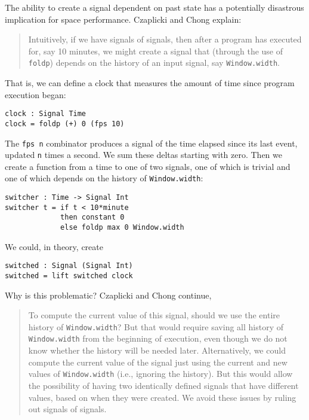 \documentclass{article}
\begin{document}
The ability to create a signal dependent on past state has a potentially
disastrous implication for space performance. Czaplicki and Chong explain:

\begin{quote}
Intuitively, if we have signals of signals, then after a program has executed
for, say 10 minutes, we might create a signal that (through the use of
\texttt{foldp}) depends on the history of an input signal, say
\texttt{Window.width}. \cite{CzaplickiC13}
\end{quote}

That is, we can define a clock that measures the amount of time since
program execution began:

\begin{verbatim}
clock : Signal Time
clock = foldp (+) 0 (fps 10)
\end{verbatim}

The \texttt{fps n} combinator produces a signal of the time elapsed
since its last event, updated \texttt{n} times a second. We sum these
deltas starting with zero. Then we create a function from a time to one
of two signals, one of which is trivial and one of which depends on the
history of \texttt{Window.width}:

\begin{verbatim}
switcher : Time -> Signal Int
switcher t = if t < 10*minute
             then constant 0
             else foldp max 0 Window.width
\end{verbatim}

We could, in theory, create

\begin{verbatim}
switched : Signal (Signal Int)
switched = lift switched clock
\end{verbatim}

Why is this problematic? Czaplicki and Chong continue,

\begin{quote}
To compute the current value of this signal, should we use the entire
history of \texttt{Window.width}? But that would require saving all
history of \texttt{Window.width} from the beginning of execution, even
though we do not know whether the history will be needed later.
Alternatively, we could compute the current value of the signal just
using the current and new values of \texttt{Window.width} (i.e.,
ignoring the history). But this would allow the possibility of having
two identically defined signals that have different values, based on
when they were created. We avoid these issues by ruling out signals of
signals. \cite{CzaplickiC13}
\end{quote}
\end{document}
